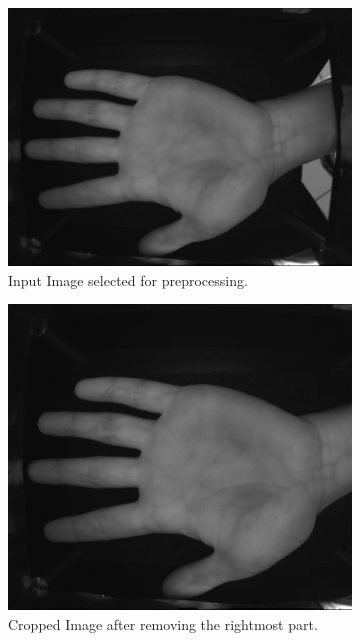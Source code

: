 \begin{enumerate}
    \begin{figure}[!ht]
        \centering
        \begin{subfigure}[t]{0.48\columnwidth}
            \includegraphics[width=\textwidth]{./images/preprocessing/selected_image.jpg}
            \caption{Input Image selected for preprocessing.}
            \label{fig:selected_image}
        \end{subfigure}
        \hfill
        \begin{subfigure}[t]{0.48\columnwidth}
            \includegraphics[width=\textwidth]{./images/preprocessing/cropped_image.png}
            \caption{Cropped Image after removing the rightmost part.} 
            \label{fig:cropped_image}
        \end{subfigure}
        \caption{}
    \end{figure}


\end{enumerate}
